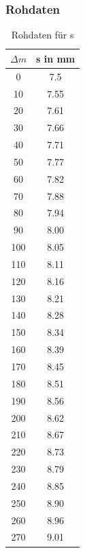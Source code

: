 \documentclass[12pt,a4paper]{article}
\begin{document}
\subsubsection{Rohdaten}
\begin{table}[H]\centering
	\begin{tabular}{c||c}
		$\Delta m$&s in mm\\
		\hline
		0&7.5\\
		10&7.55\\
		20&7.61\\
		30&7.66\\
		40&7.71\\
		50&7.77\\
		60&7.82\\
		70&7.88\\
		80&7.94\\
		90&8.00\\
		100&8.05\\
		110&8.11\\
		120&8.16\\
		130&8.21\\
		140&8.28\\
		150&8.34\\
		160&8.39\\
		170&8.45\\
		180&8.51\\
		190&8.56\\
		200&8.62\\
		210&8.67\\
		220&8.73\\
		230&8.79\\
		240&8.85\\
		250&8.90\\
		260&8.96\\
		270&9.01\\
		
	\end{tabular}
	\caption{Rohdaten für s}\label{Tabelle}
\end{table}
\end{document}

